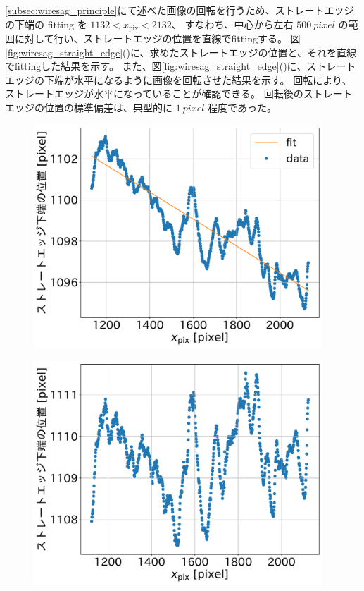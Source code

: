 \documentclass[../../main.tex]{subfiles}
\begin{document}
\ref{subsec:wiresag_principle}にて述べた画像の回転を行うため、ストレートエッジの下端の fitting を $1132 < x_{\mathrm{pix}} < 2132$、
すなわち、中心から左右 $\SI{500}{pixel}$ の範囲に対して行い、ストレートエッジの位置を直線でfittingする。
図\ref{fig:wiresag_straight_edge}()に、求めたストレートエッジの位置と、それを直線でfittingした結果を示す。
また、図\ref{fig:wiresag_straight_edge}()に、ストレートエッジの下端が水平になるように画像を回転させた結果を示す。
回転により、ストレートエッジが水平になっていることが確認できる。
回転後のストレートエッジの位置の標準偏差は、典型的に $\SI{1}{pixel}$ 程度であった。
\begin{figure}[H]
    \begin{minipage}[b]{0.5\hsize}
        \centering
        \includegraphics[width=0.97\textwidth]{wiresag/wiresag_straight_edge_positions_line.pdf}
        \subcaption{}
        \label{fig:wiresag_straight_edge_positions_line}
    \end{minipage}
    \begin{minipage}[b]{0.5\hsize}
        \centering
        \includegraphics[width=0.97\textwidth]{wiresag/wiresag_straight_edge_positions_rot.pdf}

\end{minipage}
\end{figure}
\end{document}
